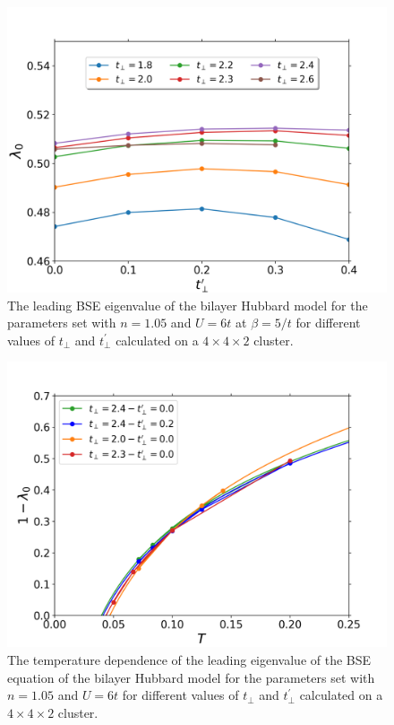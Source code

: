 \documentclass[prb,twocolumn,amsmath,amssymb,superscriptaddress,floatfix,nofootinbib]{revtex4-2}
\begin{document}
 \begin{figure}
\centering
\includegraphics[scale=0.43]{Lambda0_U6_n0pt95_bt5_vary_tp_tpp.png}
\caption{The leading BSE eigenvalue of the bilayer Hubbard model for the parameters set with $n=1.05$ and $U=6t$ at $\beta= 5/t$ for different values of $t_{\perp}$ and $t_{\perp}^{\prime}$ calculated on a $4\times 4\times 2$ cluster. }
\label{fig:lambdatperpprime3}
\end{figure}

 
 
 \begin{figure}
\centering
\includegraphics[width=\columnwidth]{Lambda0_U6_n0pt95_vary_tp_tpp_temp.png}
\caption{The temperature dependence of the leading eigenvalue of the BSE equation of the bilayer Hubbard model for the parameters set with $n=1.05$ and $U=6t$ for different values of $t_{\perp}$ and $t_{\perp}^{\prime}$ calculated on a $4\times 4\times 2$ cluster.  }
\label{fig:lambdavsT_n0.95}
\end{figure}
\end{document}

